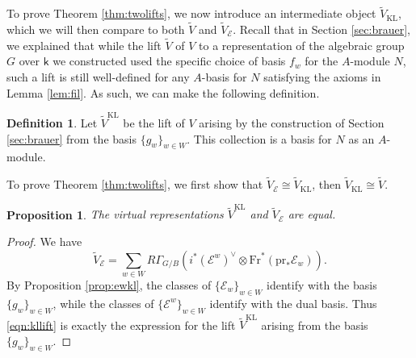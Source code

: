 \documentclass{amsart}
\newtheorem{prop}[thm]{Proposition}
\theoremstyle{definition}
\newtheorem{defn}[thm]{Definition}
\begin{document}
To prove Theorem \ref{thm:twolifts}, we now introduce an intermediate object $\tilde{V}_{\mathrm{KL}}$, which we will then compare to both $\tilde{V}$ and $\tilde{V}_{\mathcal{E}}$. Recall that in Section \ref{sec:brauer}, we explained that while the lift $\tilde{V}$ of $V$ to a representation of the algebraic group $G$ over $\mathsf{k}$ we constructed used the specific choice of basis $f_w$ for the $A$-module $N$, such a lift is still well-defined for any $A$-basis for $N$ satisfying the axioms in Lemma \ref{lem:fil}. As such, we can make the following definition.
\begin{defn}
    Let $\tilde{V}^{\mathrm{KL}}$ be the lift of $V$ arising by the construction of Section \ref{sec:brauer} from the basis $\{g_w\}_{w \in W}$. This collection is a basis for $N$ as an $A$-module.
\end{defn}

To prove Theorem \ref{thm:twolifts}, we first show that $\tilde{V}_{\mathcal{E}} \cong \tilde{V}_{\mathrm{KL}}$, then $\tilde{V}_{\mathrm{KL}} \cong \tilde{V}$. 

\begin{prop}\label{prop:klande}
    The virtual representations $\tilde{V}^{\mathrm{KL}}$ and $\tilde{V}_{\mathcal{E}}$ are equal.
\end{prop}
\begin{proof}
We have
    \begin{equation}
    \tilde{V}_{\mathcal{E}} = \sum_{w \in W} R\Gamma_{G/B}(i^*(\mathcal{E}^{w})^\vee\otimes \mathrm{Fr}^*(\mathrm{pr}_*\mathcal{E}_{w})).\label{eqn:kllift}
    \end{equation}
    By Proposition \ref{prop:ewkl}, the classes of $\{\mathcal{E}_w\}_{w \in W}$ identify with the basis $\{g_w\}_{w \in W}$, while the classes of $\{\mathcal{E}^w\}_{w \in W}$ identify with the dual basis. Thus \eqref{eqn:kllift} is exactly the expression for the lift $\tilde{V}^{\mathrm{KL}}$ arising from the basis $\{g_w\}_{w \in W}$.
\end{proof}
\end{document}
